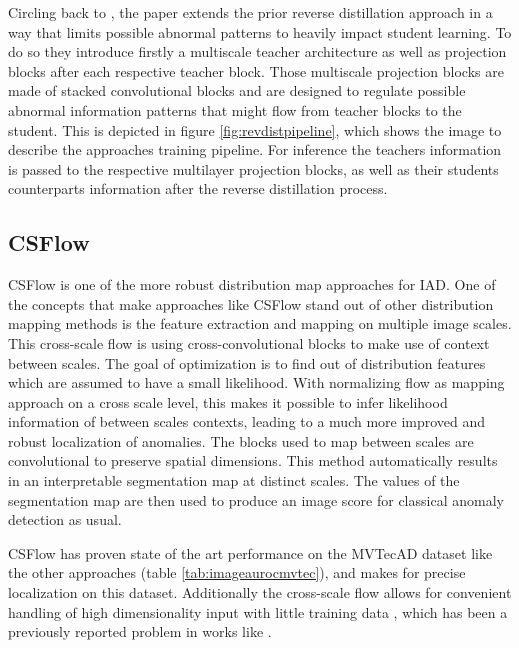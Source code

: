 Circling back to \cite{revdist2023}, the paper extends the prior reverse distillation approach in a way that limits possible abnormal patterns to heavily impact student learning. To do so they 
introduce firstly a multiscale teacher architecture as well as projection blocks after each respective teacher block. Those multiscale projection blocks are made of stacked convolutional blocks 
and are designed to regulate possible abnormal information patterns that might flow from teacher blocks to the student. This is depicted in figure \ref{fig:revdistpipeline}, which shows the image to describe the 
approaches training pipeline. For inference the teachers information is passed to the respective multilayer projection blocks, as well as their students counterparts information after the 
reverse distillation process.


\subsection{CSFlow}
\label{subsec:csflow}

CSFlow \cite{csflow2022} is one of the more robust distribution map approaches for IAD. %
One of the concepts that make 
approaches like CSFlow stand out of other distribution mapping methods is the feature extraction and mapping on multiple image scales. This cross-scale flow is using cross-convolutional 
blocks \cite{liu2024deep} to make use of context between scales. The goal of optimization is to find out of distribution features which are assumed to have a small likelihood. 
With normalizing flow \cite{Kobyzev_2021normalizingflowexplanation} as mapping approach on a cross scale level, this makes it possible to infer likelihood information of between scales contexts, 
leading to a much more improved and robust localization of anomalies. The blocks used to map between scales 
are convolutional to preserve spatial dimensions. This method automatically results in an interpretable segmentation map at distinct scales. The values of the segmentation map are then used to produce an 
image score for classical anomaly detection as usual.


CSFlow has proven state of the art performance on the MVTecAD dataset like the other approaches (table \ref{tab:imageaurocmvtec}), and makes for precise localization on this dataset. Additionally the cross-scale flow allows 
for convenient handling of high dimensionality input with little training data \cite{csflow2022}, which has been a previously reported problem in works like \cite{Rudolph_2021badNF}.



